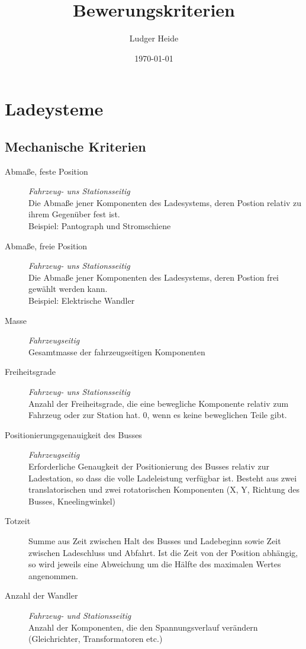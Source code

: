 \documentclass{scrartcl}
\title{Bewerungskriterien}
\date{\today}
\author{Ludger Heide}
\begin{document}

\maketitle



\section{Ladeysteme}

\subsection{Mechanische Kriterien}
\begin{description}
	\item [Abmaße, feste Position] \emph{Fahrzeug- uns Stationsseitig}\\
	Die Abmaße jener Komponenten des Ladesystems, deren Postion relativ zu ihrem Gegenüber fest ist.\\
	Beispiel: Pantograph und Stromschiene
	\item [Abmaße, freie Position] \emph{Fahrzeug- uns Stationsseitig}\\
	Die Abmaße jener Komponenten des Ladesystems, deren Postion frei gewählt werden kann.\\
	Beispiel: Elektrische Wandler
	\item [Masse] \emph{Fahrzeugseitig}\\
	Gesamtmasse der fahrzeugseitigen Komponenten
	\item [Freiheitsgrade] \emph{Fahrzeug- uns Stationsseitig}\\
	Anzahl der Freiheitsgrade, die eine bewegliche Komponente relativ zum Fahrzeug oder zur Station hat. 0, wenn es keine beweglichen Teile gibt.
	\item [Positionierungsgenauigkeit des Busses] \emph{Fahrzeugseitig} \\
	Erforderliche Genaugkeit der Positionierung des Busses relativ zur Ladestation, so dass die volle Ladeleistung verfügbar ist. Besteht aus zwei translatorischen und zwei rotatorischen Komponenten (X, Y, Richtung des Busses, Kneelingwinkel)
	\item [Totzeit]
	Summe aus Zeit zwischen Halt des Busses und Ladebeginn sowie Zeit zwischen Ladeschluss und Abfahrt. Ist die Zeit von der Position abhängig, so wird jeweils eine Abweichung um die Hälfte des maximalen Wertes angenommen.
	 \item [Anzahl der Wandler] \emph{Fahrzeug- und Stationsseitig}\\
		Anzahl der Komponenten, die den Spannungsverlauf verändern (Gleichrichter, Transformatoren etc.)
\end{description}
\end{document}

